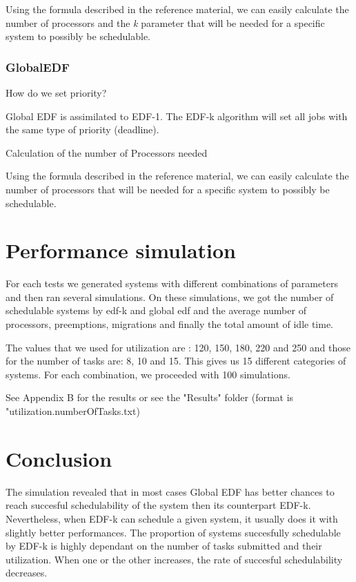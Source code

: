 \documentclass[11pt, a4paper,titlepage]{article}
\begin{document}
Using the formula described in the reference material, we can easily calculate the number of processors and the \emph{k} parameter that will be needed for a specific system to possibly be schedulable.

\subsubsection{GlobalEDF}

\begin{description}
\item [How do we set priority?] \hfill
\end{description}

Global EDF is assimilated to EDF-1. The EDF-k algorithm will set all jobs with the same type of priority (deadline).

\begin{description}
\item [Calculation of the number of Processors needed] \hfill
\end{description}

Using the formula described in the reference material, we can easily calculate the number of processors that will be needed for a specific system to possibly be schedulable.

\section{Performance simulation}

For each tests we generated systems with different combinations of parameters and then ran several simulations. On these simulations, we got the number of schedulable systems by edf-k and global edf and the average number of processors, preemptions, migrations and finally the total amount of idle time. 

The values that we used for utilization are : 120, 150, 180, 220 and 250 and those for the number of tasks are: 8, 10 and 15. This gives us 15 different  categories of systems. For each combination, we proceeded with 100 simulations.

See Appendix B for the results or see the "Results" folder (format is "utilization.numberOfTasks.txt)

\section{Conclusion}

The simulation revealed that in most cases Global EDF has better chances to reach succesful schedulability of the system then its counterpart EDF-k. Nevertheless, when EDF-k can schedule a given system, it usually does it with slightly better performances. The proportion of systems succesfully schedulable by EDF-k is highly dependant on the number of tasks submitted and their utilization. When one or the other increases, the rate of succesful schedulability decreases.
\end{document}
